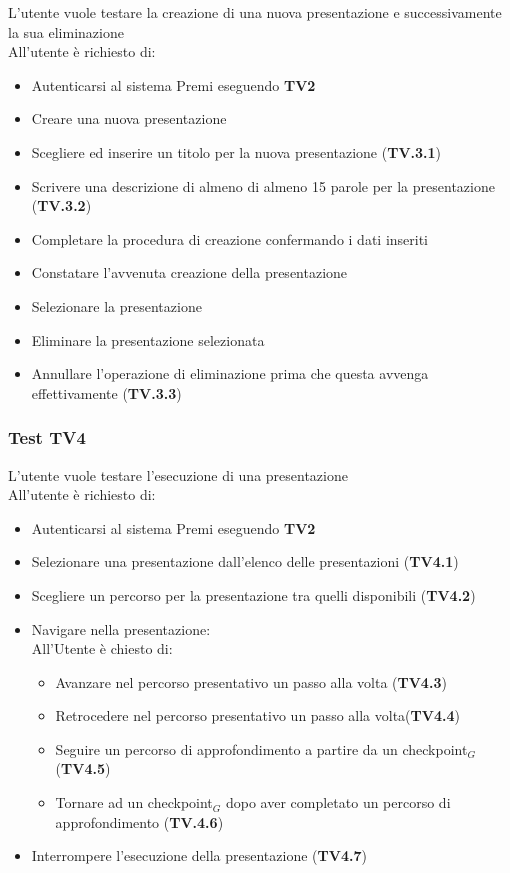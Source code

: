 L'utente vuole testare la creazione di una nuova presentazione e successivamente la sua eliminazione\\
All'utente è richiesto di:
\begin{itemize}
	\item Autenticarsi al sistema Premi eseguendo \textbf{TV2}
	\item Creare una nuova presentazione 
	\item Scegliere ed inserire un titolo per la nuova presentazione (\textbf{TV.3.1}) 
	\item Scrivere una descrizione di almeno di almeno 15 parole per la presentazione (\textbf{TV.3.2})  
	\item Completare la procedura di creazione confermando i dati inseriti
	\item Constatare l'avvenuta creazione della presentazione
	\item Selezionare la presentazione
	\item Eliminare la presentazione selezionata 
	\item Annullare l'operazione di eliminazione prima che questa avvenga effettivamente (\textbf{TV.3.3})
\end{itemize}

\subsubsection {Test TV4} %

L'utente vuole testare l'esecuzione di una presentazione\\
All'utente è richiesto di:

\begin{itemize}
	\item Autenticarsi al sistema Premi eseguendo \textbf{TV2}
	\item Selezionare una presentazione dall'elenco delle presentazioni (\textbf{TV4.1}) 
	\item Scegliere un percorso per la presentazione tra quelli disponibili (\textbf{TV4.2})
	\item Navigare nella presentazione:\\
	All'Utente è chiesto di:
	\begin{itemize}
		\item Avanzare nel percorso presentativo un passo alla volta (\textbf{TV4.3})
		\item Retrocedere nel percorso presentativo un passo alla volta(\textbf{TV4.4}) 
		\item Seguire un percorso di approfondimento a partire da un checkpoint$_G$ (\textbf{TV4.5})
		\item Tornare ad un checkpoint$_G$ dopo aver completato un percorso di approfondimento (\textbf{TV.4.6})
		\end{itemize}
	\item Interrompere l'esecuzione della presentazione (\textbf{TV4.7})
\end{itemize}

